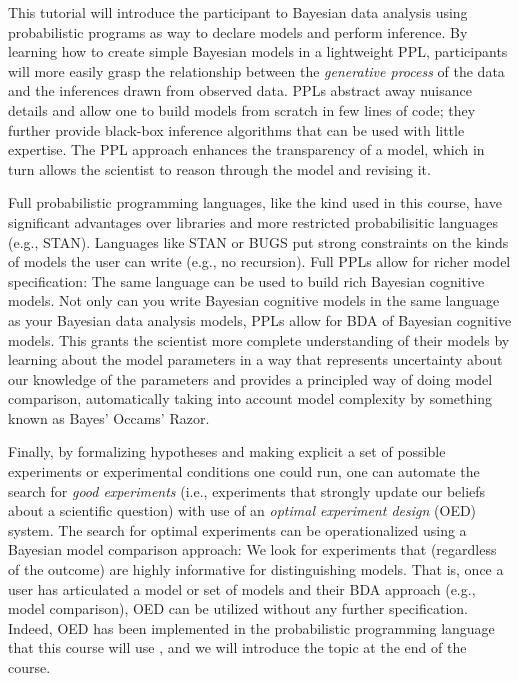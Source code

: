\documentclass[10pt,letterpaper]{article}
\begin{document}
This tutorial will introduce the participant to Bayesian data analysis using probabilistic programs as way to declare models and perform inference. 
By learning how to create simple Bayesian models in a lightweight PPL, participants will more easily grasp the relationship between the \emph{generative process} of the data and the inferences drawn from observed data.
PPLs abstract away nuisance details and allow one to build models from scratch in few lines of code; they further provide black-box inference algorithms that can be used with little expertise.
The PPL approach enhances the transparency of a model, which in turn allows the scientist to reason through the model and revising it. 

Full probabilistic programming languages, like the kind used in this course, have significant advantages over libraries and more restricted probabilisitic languages (e.g., STAN).  
Languages like STAN or BUGS put strong constraints on the kinds of models the user can write (e.g., no recursion). 
Full PPLs allow for richer model specification: The same language can be used to build rich Bayesian cognitive models. 
Not only can you write Bayesian cognitive models in the same language as your Bayesian data analysis models, PPLs allow for BDA of Bayesian cognitive models. 
This grants the scientist more complete understanding of their models by learning about the model parameters in a way that represents uncertainty about our knowledge of the parameters and provides a principled way of doing model comparison, automatically taking into account model complexity by something known as Bayes' Occams' Razor.

Finally, by formalizing hypotheses and making explicit a set of possible experiments or experimental conditions one could run, one can automate the search for \emph{good experiments} (i.e., experiments that strongly update our beliefs about a scientific question) with use of an \emph{optimal experiment design} (OED) system.
The search for optimal experiments can be operationalized using a Bayesian model comparison approach: We look for experiments that (regardless of the outcome) are highly informative for distinguishing models. 
That is, once a user has articulated a model or set of models and their BDA approach (e.g., model comparison), OED can be utilized without any further specification. 
Indeed, OED has been implemented in the probabilistic programming language that this course will use \cite{ouyangArxivOED}, and we will introduce the topic at the end of the course.
\end{document}
